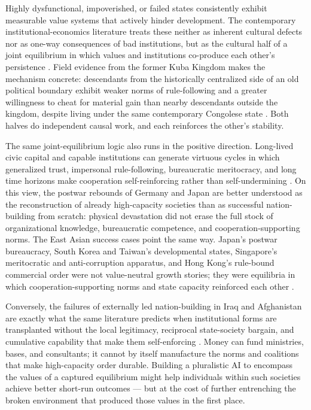\documentclass{article}
\theoremstyle{plain}
\theoremstyle{definition}
\theoremstyle{remark}
\begin{document}
Highly dysfunctional, impoverished, or failed states consistently exhibit measurable value systems that actively hinder development. The contemporary institutional-economics literature treats these neither as inherent cultural defects nor as one-way consequences of bad institutions, but as the cultural half of a joint equilibrium in which values and institutions co-produce each other's persistence \citep{greif2006institutions, tabellini2008institutions, alesina2015culture, bisin2001economics, northwallisweingast2009}. Field evidence from the former Kuba Kingdom makes the mechanism concrete: descendants from the historically centralized side of an old political boundary exhibit weaker norms of rule-following and a greater willingness to cheat for material gain than nearby descendants outside the kingdom, despite living under the same contemporary Congolese state \citep{lowes2017kuba}. Both halves do independent causal work, and each reinforces the other's stability.

The same joint-equilibrium logic also runs in the positive direction. Long-lived civic capital and capable institutions can generate virtuous cycles in which generalized trust, impersonal rule-following, bureaucratic meritocracy, and long time horizons make cooperation self-reinforcing rather than self-undermining \citep{guiso2016long, tabellini2008institutions, alesina2015culture, evans1995embedded, wade2018developmental}. On this view, the postwar rebounds of Germany and Japan are better understood as the reconstruction of already high-capacity societies than as successful nation-building from scratch: physical devastation did not erase the full stock of organizational knowledge, bureaucratic competence, and cooperation-supporting norms. The East Asian success cases point the same way. Japan's postwar bureaucracy, South Korea and Taiwan's developmental states, Singapore's meritocratic and anti-corruption apparatus, and Hong Kong's rule-bound commercial order were not value-neutral growth stories; they were equilibria in which cooperation-supporting norms and state capacity reinforced each other \citep{johnson1982miti, amsden1989asia, haggard1990pathways, wade2018developmental}.

Conversely, the failures of externally led nation-building in Iraq and Afghanistan are exactly what the same literature predicts when institutional forms are transplanted without the local legitimacy, reciprocal state-society bargain, and cumulative capability that make them self-enforcing \citep{andrews2017statecapability, donais2009empowerment, bohnke2017state}. Money can fund ministries, bases, and consultants; it cannot by itself manufacture the norms and coalitions that make high-capacity order durable. Building a pluralistic AI to encompass the values of a captured equilibrium might help individuals within such societies achieve better short-run outcomes --- but at the cost of further entrenching the broken environment that produced those values in the first place.
\end{document}
